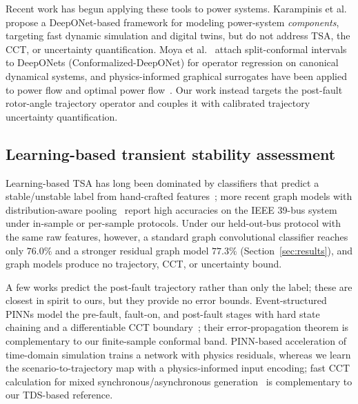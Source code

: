 \documentclass[5p,times]{elsarticle}
\begin{document}
Recent work has begun applying these tools to power systems. Karampinis et
al.~\cite{karampinis2025neural} propose a DeepONet-based framework for modeling power-system
\emph{components}, targeting fast dynamic simulation and digital twins, but do not address TSA,
the CCT, or uncertainty quantification. Moya et al.~\cite{moya2025conformal} attach
split-conformal intervals to DeepONets (Conformalized-DeepONet) for operator regression on
canonical dynamical systems, and physics-informed graphical surrogates have been applied to power
flow and optimal power flow~\cite{huang2025optimal, chen2025power}. Our work instead targets the
post-fault rotor-angle trajectory operator and couples it with calibrated trajectory
uncertainty quantification.

\subsection{Learning-based transient stability assessment}
Learning-based TSA has long been dominated by classifiers that predict a stable/unstable label
from hand-crafted features~\cite{alimi2020review}; more recent graph models with
distribution-aware pooling~\cite{chen2022distribution} report high accuracies on the IEEE 39-bus
system under in-sample or per-sample protocols. Under our held-out-bus protocol with the same raw
features, however, a standard graph convolutional classifier reaches only $76.0\%$ and a stronger
residual graph model $77.3\%$ (Section~\ref{sec:results}), and graph models produce no
trajectory, CCT, or uncertainty bound.

A few works predict the post-fault trajectory rather than only the label; these are closest in
spirit to ours, but they provide no error bounds. Event-structured PINNs model the pre-fault,
fault-on, and post-fault stages with hard state chaining and a differentiable CCT
boundary~\cite{hao2026event}; their error-propagation theorem is complementary to our
finite-sample conformal band. PINN-based acceleration of time-domain simulation
\cite{stiasny2021transient} trains a network with physics residuals, whereas we learn the
scenario-to-trajectory map with a physics-informed input encoding; fast CCT calculation for
mixed synchronous/asynchronous generation~\cite{wang2025fast} is complementary to our TDS-based
reference.
\end{document}
